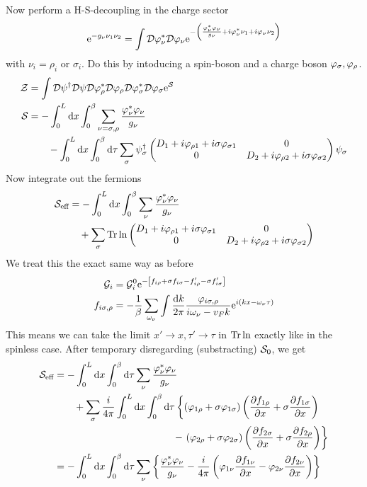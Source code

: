 Now perform a H-S-decoupling in the charge sector
\begin{equation}
\mathrm{e}^{-g_\nu\nu_1\nu_2} = \int\mathcal{D}\varphi_\nu^* \mathcal{D}\varphi_\nu\mathrm{e}^{-\left(\frac{\varphi_\nu^* \varphi_\nu}{g_\nu}+i\varphi_\nu^* \nu_1+i\varphi_\nu\nu_2\right)}
\end{equation}
with \(\nu_i = \rho_i \text{ or } \sigma_i\). Do this by intoducing a spin-boson and a charge boson \(\varphi_\sigma, \varphi_\rho\).
\begin{align*}
\mathcal{Z} &= \int\mathcal{D}\psi^\dagger\mathcal{D}\psi\mathcal{D}\varphi_\rho^*\mathcal{D}\varphi_\rho\mathcal{D}\varphi_\sigma^*\mathcal{D}\varphi_\sigma\mathrm{e}^{\mathcal{S}} \\
\mathcal{S} &=  -\int_0^L\dd{x}\int_0^\beta\sum_{\nu=\sigma, \rho}\frac{\varphi_\nu^*\varphi_\nu}{g_\nu} \\
&\qquad -\int_0^L\dd{x}\int_0^\beta\dd{\tau}\sum_\sigma 
\psi_{\sigma}^\dagger
\begin{pmatrix}
D_1+i\varphi_{\rho 1}+i\sigma\varphi_{\sigma 1} & 0\\
0 & D_2+i\varphi_{\rho 2} +i\sigma\varphi_{\sigma 2}
\end{pmatrix} \psi_\sigma
\end{align*}
Now integrate out the fermions 
\begin{align*}
\mathcal{S}_{\text{eff}} &= -\int_0^L\dd{x}\int_0^\beta\sum_\nu\frac{\varphi_\nu^*\varphi_\nu}{g_\nu} \\
&\quad +\sum_\sigma\Tr\ln 
\begin{pmatrix}
D_1+i\varphi_{\rho 1}+i\sigma\varphi_{\sigma 1} & 0\\
0 & D_2+i\varphi_{\rho 2} +i\sigma\varphi_{\sigma 2}
\end{pmatrix}
\end{align*}
We treat this the exact same way as before
\begin{align}
\mathcal{G}_i &=\mathcal{G}_i^0\mathrm{e}^{-\left[f_{i\rho}+\sigma f_{i\sigma}-f_{i\rho}'-\sigma f_{i\sigma}'\right]} \\
f_{i\sigma,\rho } &= -\frac1\beta\sum_{\omega_\nu}\int\frac{\dd k}{2\pi}\frac{\varphi_{i\sigma,\rho}}{i\omega_\nu-v_Fk}\mathrm{e}^{i(kx-\omega_\nu\tau)}
\end{align}
This means we can take the limit \(x'\rightarrow x, \tau'\rightarrow\tau\) in \(\Tr\ln\) exactly like in the spinless case. After temporary disregarding (substracting) \(\mathcal{S}_0\), we get
\begin{align*}
\Sa_{\text{eff}} &= -\int_0^L\dx\int_0^\beta\dd{\tau}\sum_\nu\frac{\p_\nu^*\p_\nu}{g_\nu} \\
&\qquad +\sum_\sigma\frac{i}{4\pi}\int_0^L\dx\int_0^\beta\dd{\tau}\left\{\left(\p_{1\rho}+\sigma\p_{1\sigma}\right)\left(\pdv{f_{1\rho}}{x}+\sigma\pdv{f_{1\sigma}}{x}\right)\right. \\ 
& \hspace{12em} -\left.\left(\p_{2\rho}+\sigma\p_{2\sigma}\right)\left(\pdv{f_{2\sigma}}{x}+\sigma\pdv{f_{2\rho}}{x}\right)\right\} \\
&= -\int_0^L\dx\int_0^\beta\dd{\tau}\sum_\nu\left\{\frac{\p_\nu^*\p_\nu}{g_\nu} - \frac{i}{4\pi}\left(\p_{1\nu}\pdv{f_{1\nu}}{x}-\p_{2\nu}\pdv{f_{2\nu}}{x}\right)\right\}
\end{align*}
